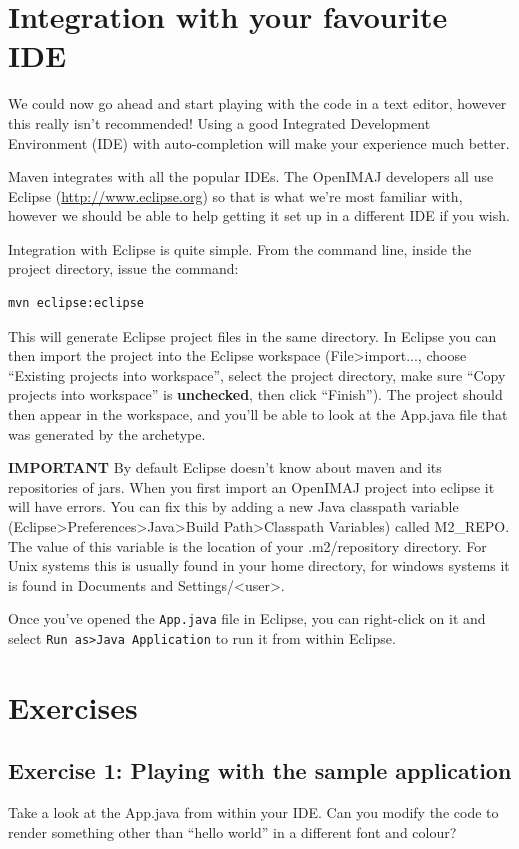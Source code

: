 \documentclass[10pt,a4paper,twoside,extrafontsizes]{memoir}
\begin{document}
\section*{Integration with your favourite IDE}
We could now go ahead and start playing with the code in a text editor, however this really 
isn't recommended! Using a good Integrated Development Environment (IDE) with auto-completion will 
make your experience much better.

Maven integrates with all the popular IDEs. The OpenIMAJ developers all use Eclipse 
(\url{http://www.eclipse.org}) so that is what we're most familiar with, however we should be able 
to help getting it set up in a different IDE if you wish. 

Integration with Eclipse is quite simple. From the command line, inside the project directory, 
issue the command:
\begin{lstlisting}[language=bash]
mvn eclipse:eclipse
\end{lstlisting}
This will generate Eclipse project files in the same directory. In Eclipse you can then import 
the project into the Eclipse workspace (File>import..., choose ``Existing projects into workspace'', 
select the project directory, make sure ``Copy projects into workspace'' is \textbf{unchecked}, then click
 ``Finish''). The project should then appear in the workspace, and you'll be able to look at the 
App.java file that was generated by the archetype.

\textbf{IMPORTANT} By default Eclipse doesn't know about maven and its repositories of jars. When you 
first import an OpenIMAJ project into eclipse it will have errors. You can fix this by adding 
a new Java classpath variable (Eclipse>Preferences>Java>Build Path>Classpath Variables) 
called M2\_REPO. The value of this variable is the location of your .m2/repository directory. 
For Unix systems this is usually found in your home directory, for windows systems it is found 
in Documents and Settings/<user>.

Once you've opened the \verb+App.java+ file in Eclipse, you can right-click on it and select 
\verb+Run as>Java Application+ to run it from within Eclipse.

\section*{Exercises}
\subsection{Exercise 1: Playing with the sample application}
Take a look at the App.java from within your IDE. Can you modify the code to render something 
other than ``hello world'' in a different font and colour? 
\end{document}
